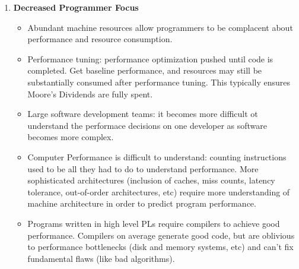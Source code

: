 \documentclass [12pt]{article}
\begin{document}
\begin{itemize}
\begin{enumerate}
                    \item \textbf{Decreased Programmer Focus}
                        \begin{itemize}
                            \item Abundant machine resources allow programmers to be complacent about performance and resource consumption. 
                            \item Performance tuning: performance optimization pushed until code is completed. Get baseline performance, and resources may still be substantially consumed after performance tuning. This typically ensures Moore's Dividends are fully spent. 
                            \item Large software development teams: it becomes more difficult ot understand the performace decisions on one developer as software becomes more complex. 
                            \item Computer Performance is difficult to understand: counting instructions used to be all they had to do to understand performance. More sophisticated architectures (inclusion of caches, miss counts, latency tolerance, out-of-order architectures, etc) require more understanding of machine architecture in order to predict program performance. 
                            \item Programs written in high level PLs require compilers to achieve good performance. Compilers on average generate good code, but are oblivious to performance bottlenecks (disk and memory systems, etc) and can't fix fundamental flaws (like bad algorithms).
                        \end{itemize}
                   

\end{enumerate}
\end{itemize}
\end{document}
